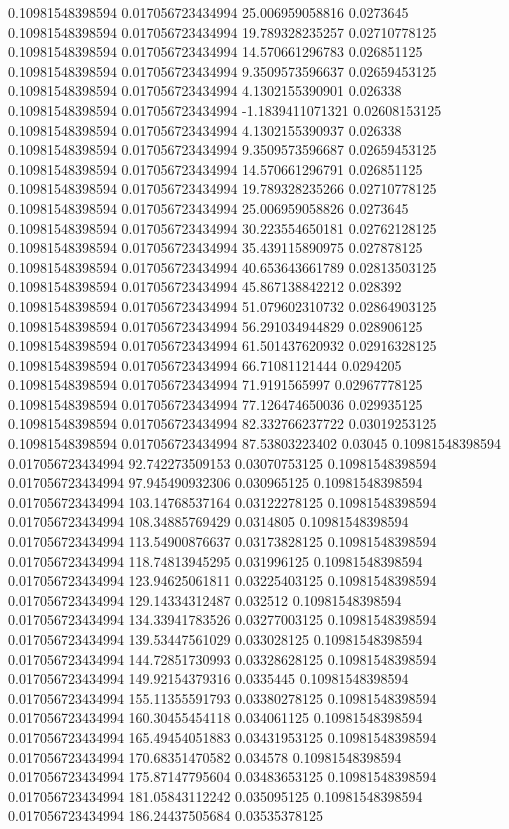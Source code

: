 0.10981548398594 0.017056723434994 25.006959058816 0.0273645
0.10981548398594 0.017056723434994 19.789328235257 0.02710778125
0.10981548398594 0.017056723434994 14.570661296783 0.026851125
0.10981548398594 0.017056723434994 9.3509573596637 0.02659453125
0.10981548398594 0.017056723434994 4.1302155390901 0.026338
0.10981548398594 0.017056723434994 -1.1839411071321 0.02608153125
0.10981548398594 0.017056723434994 4.1302155390937 0.026338
0.10981548398594 0.017056723434994 9.3509573596687 0.02659453125
0.10981548398594 0.017056723434994 14.570661296791 0.026851125
0.10981548398594 0.017056723434994 19.789328235266 0.02710778125
0.10981548398594 0.017056723434994 25.006959058826 0.0273645
0.10981548398594 0.017056723434994 30.223554650181 0.02762128125
0.10981548398594 0.017056723434994 35.439115890975 0.027878125
0.10981548398594 0.017056723434994 40.653643661789 0.02813503125
0.10981548398594 0.017056723434994 45.867138842212 0.028392
0.10981548398594 0.017056723434994 51.079602310732 0.02864903125
0.10981548398594 0.017056723434994 56.291034944829 0.028906125
0.10981548398594 0.017056723434994 61.501437620932 0.02916328125
0.10981548398594 0.017056723434994 66.71081121444 0.0294205
0.10981548398594 0.017056723434994 71.9191565997 0.02967778125
0.10981548398594 0.017056723434994 77.126474650036 0.029935125
0.10981548398594 0.017056723434994 82.332766237722 0.03019253125
0.10981548398594 0.017056723434994 87.53803223402 0.03045
0.10981548398594 0.017056723434994 92.742273509153 0.03070753125
0.10981548398594 0.017056723434994 97.945490932306 0.030965125
0.10981548398594 0.017056723434994 103.14768537164 0.03122278125
0.10981548398594 0.017056723434994 108.34885769429 0.0314805
0.10981548398594 0.017056723434994 113.54900876637 0.03173828125
0.10981548398594 0.017056723434994 118.74813945295 0.031996125
0.10981548398594 0.017056723434994 123.94625061811 0.03225403125
0.10981548398594 0.017056723434994 129.14334312487 0.032512
0.10981548398594 0.017056723434994 134.33941783526 0.03277003125
0.10981548398594 0.017056723434994 139.53447561029 0.033028125
0.10981548398594 0.017056723434994 144.72851730993 0.03328628125
0.10981548398594 0.017056723434994 149.92154379316 0.0335445
0.10981548398594 0.017056723434994 155.11355591793 0.03380278125
0.10981548398594 0.017056723434994 160.30455454118 0.034061125
0.10981548398594 0.017056723434994 165.49454051883 0.03431953125
0.10981548398594 0.017056723434994 170.68351470582 0.034578
0.10981548398594 0.017056723434994 175.87147795604 0.03483653125
0.10981548398594 0.017056723434994 181.05843112242 0.035095125
0.10981548398594 0.017056723434994 186.24437505684 0.03535378125
